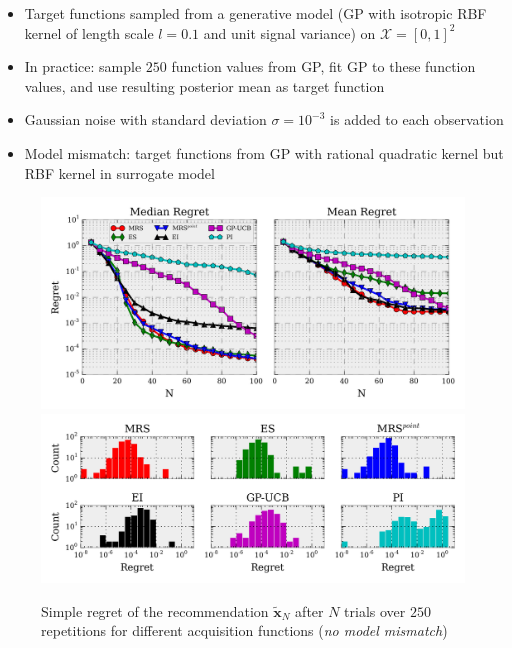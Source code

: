 


\begin{block}{}
\begin{itemize}
 \item Target functions sampled from a generative model (GP with isotropic RBF kernel
of length scale $l = 0.1$ and unit signal variance) on $\mathcal{X} = [0, 1]^2$ 
 \item In practice: sample $250$ function values from GP, fit GP to these function values, and use resulting posterior mean as target function
 \item Gaussian noise with standard deviation $\sigma =10^{-3}$ is added to each observation
 \item Model mismatch: target functions from GP with rational quadratic kernel but RBF kernel in surrogate model
\end{itemize}

\begin{center}

\begin{figure}
\centering
\includegraphics[width=.8\columnwidth]{../pics/empirical_comparison} \\
\includegraphics[width=.8\columnwidth]{../pics/hist}
\caption{Simple regret of the recommendation $\mathbf{\tilde x}_N$ after $N$ trials over $250$ repetitions for different acquisition functions (\emph{no model mismatch})}
\label{fig:empirical_comparison}
\end{figure}



\end{center}
\end{block}
